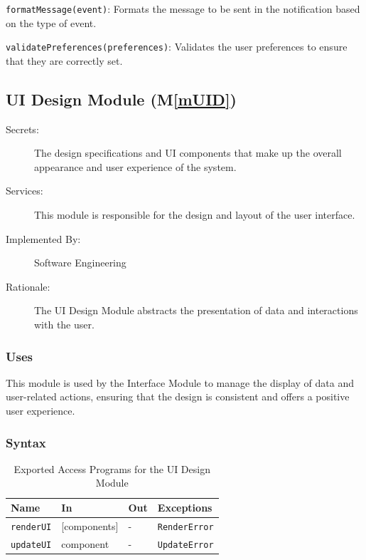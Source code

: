 \documentclass[12pt, titlepage]{article}
\newcommand{\mref}[1]{M\ref{#1}}
\begin{document}
\begin{description}
  \item[Local Function:] 
  \item \texttt{formatMessage(event)}: Formats the message to be sent in the notification based on the 
  type of event.
  \item \texttt{validatePreferences(preferences)}: Validates the user preferences to ensure that they are 
  correctly set.
\end{description}

\subsection{UI Design Module (\mref{mUID})}
\begin{description}
  \item[Secrets:] The design specifications and UI components that make  up the
  overall appearance and user experience of the system.
  \item[Services:] This module is responsible for the design and layout of the
  user interface.
  \item[Implemented By:] Software Engineering
  \item[Rationale:] The UI Design Module abstracts the presentation of data and
  interactions with the user.
\end{description}

\subsubsection{Uses}
This module is used by the Interface Module to manage the display of data and
user-related actions, ensuring that the design is consistent and offers a
positive user experience.

\subsubsection{Syntax}
\begin{description}
  \item[Exported Constants and Access Programs:]
  \item
  \begin{table}[h!]
    \centering
    \begin{tabular}{p{} p{} p{} p{}}
    \toprule
    \textbf{Name} & \textbf{In} & \textbf{Out} & \textbf{Exceptions}\\
    \midrule
    \texttt{renderUI} & [components] & - & \texttt{RenderError} \\
    \midrule
    \texttt{updateUI} & component & - & \texttt{UpdateError} \\
    \bottomrule
    \end{tabular}
    \caption{Exported Access Programs for the UI Design Module}
    \label{TblEAP_UI}
  \end{table}
\end{description}
\end{document}
